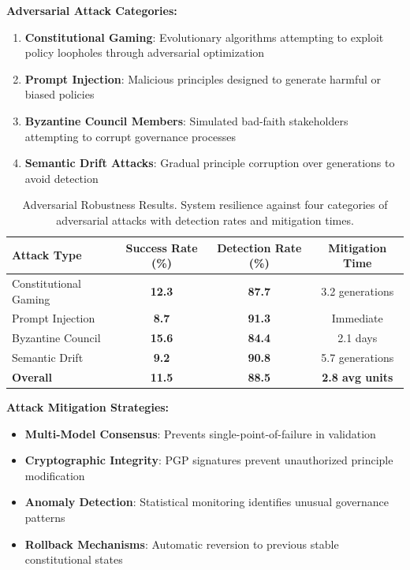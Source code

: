 \documentclass[manuscript,screen,review,anonymous,9pt]{acmart}
\newcommand{\tablesize}{\tiny}
\newcommand{\tablenumfmt}[1]{\textbf{#1}}
\begin{document}
\textbf{Adversarial Attack Categories:}
\begin{enumerate}
    \item \textbf{Constitutional Gaming}: Evolutionary algorithms attempting to exploit policy loopholes through adversarial optimization
    \item \textbf{Prompt Injection}: Malicious principles designed to generate harmful or biased policies
    \item \textbf{Byzantine Council Members}: Simulated bad-faith stakeholders attempting to corrupt governance processes
    \item \textbf{Semantic Drift Attacks}: Gradual principle corruption over generations to avoid detection
\end{enumerate}

\begin{table}[htbp]
  \centering
  \caption{Adversarial Robustness Results. System resilience against four categories of adversarial attacks with detection rates and mitigation times.}
  \label{tab:adversarial_results}
  \tablesize
  \begin{tabular}{@{}lccc@{}}
    \toprule
    \textbf{Attack Type} & \textbf{Success Rate (\%)} & \textbf{Detection Rate (\%)} & \textbf{Mitigation Time} \\
    \midrule
    Constitutional Gaming & \tablenumfmt{12.3} & \tablenumfmt{87.7} & 3.2 generations \\
    Prompt Injection & \tablenumfmt{8.7} & \tablenumfmt{91.3} & Immediate \\
    Byzantine Council & \tablenumfmt{15.6} & \tablenumfmt{84.4} & 2.1 days \\
    Semantic Drift & \tablenumfmt{9.2} & \tablenumfmt{90.8} & 5.7 generations \\
    \midrule
    \textbf{Overall} & \textbf{\tablenumfmt{11.5}} & \textbf{\tablenumfmt{88.5}} & \textbf{2.8 avg units} \\
    \bottomrule
  \end{tabular}
\end{table}

\textbf{Attack Mitigation Strategies:}
\begin{itemize}
    \item \textbf{Multi-Model Consensus}: Prevents single-point-of-failure in validation
    \item \textbf{Cryptographic Integrity}: PGP signatures prevent unauthorized principle modification
    \item \textbf{Anomaly Detection}: Statistical monitoring identifies unusual governance patterns
    \item \textbf{Rollback Mechanisms}: Automatic reversion to previous stable constitutional states
\end{itemize}
\end{document}
